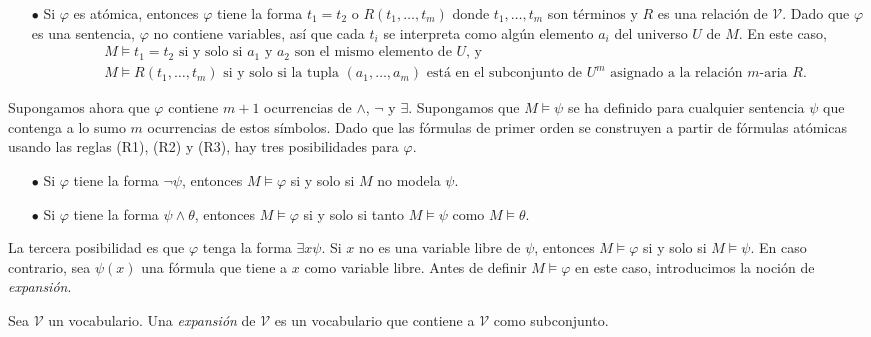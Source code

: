\message{ !name(main.tex)}\documentclass[12pt,a4paper]{book}
\newcommand{\VV}{\mathcal{V}}
\begin{document}
    \begin{itemize}
        \item[$\bullet$] Si $\varphi$ es atómica, entonces $\varphi$ tiene la forma $t_{1}=t_{2}$ o $R(t_{1},\dots,t_{m})$
        donde $t_{1},\dots,t_{m}$ son términos y $R$ es una relación de $\VV$. Dado que $\varphi$ es una sentencia,
        $\varphi$ no contiene variables, así que cada $t_{i}$ se interpreta como algún elemento $a_{i}$ del universo $U$ de
        $M$. En este caso,
        \begin{align*}
            &M\models t_{1}=t_{2}\text{ si y solo si $a_{1}$ y $a_{2}$ son el mismo elemento de $U$, y}\\
            &M\models R(t_{1},\dots,t_{m})\text{ si y solo si la tupla $(a_{1},\dots,a_{m})$ está en el subconjunto de
            $U^{m}$ asignado a la relación $m$-aria $R$.}
        \end{align*}
    \end{itemize}

    Supongamos ahora que $\varphi$ contiene $m+1$ ocurrencias de $\wedge$, $\neg$ y $\exists$. Supongamos que $M\models\psi$
    se ha definido para cualquier sentencia $\psi$ que contenga a lo sumo $m$ ocurrencias de estos símbolos. Dado que las
    fórmulas de primer orden se construyen a partir de fórmulas atómicas usando las reglas (R1), (R2) y (R3), hay tres
    posibilidades para $\varphi$.

    \begin{itemize}
        \item[$\bullet$] Si $\varphi$ tiene la forma $\neg\psi$, entonces $M\models\varphi$ si y solo si $M$ no modela $\psi$.
        \item[$\bullet$] Si $\varphi$ tiene la forma $\psi\wedge\theta$, entonces $M\models\varphi$ si y solo si tanto
        $M\models\psi$ como $M\models\theta$.
    \end{itemize}

    La tercera posibilidad es que $\varphi$ tenga la forma $\exists x\psi$. Si $x$ no es una variable libre de $\psi$,
    entonces $M\models\varphi$ si y solo si $M\models\psi$. En caso contrario, sea $\psi(x)$ una fórmula que tiene a $x$
    como variable libre. Antes de definir $M\models\varphi$ en este caso, introducimos la noción de \textit{expansión}.

    \begin{definicion}[Expansión]\label{def:expansion-vocabulario}
        Sea $\VV$ un vocabulario. Una \textit{expansión} de $\VV$ es un vocabulario que contiene a $\VV$ como subconjunto.
    \end{definicion}
\end{document}
